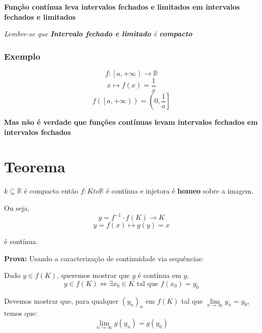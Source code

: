 \documentclass[12pt]{article}
\begin{document}
    \textbf{Função contínua leva intervalos fechados e limitados em intervalos fechados e limitados}
    
    \textit{Lembre-se que \textbf{Intervalo fechado e limitado} é \textbf{compacto}}

    \subsubsection*{Exemplo}
    \begin{equation*}
        f: \left[ a, + \infty \right) \to \mathbb{R}
    \end{equation*}
    \begin{equation*}
        x \mapsto f(x) = \frac{1}{x}
    \end{equation*}
    \begin{equation*}
        f\left( \left[a, + \infty \right) \right) = \left( 0, \frac{1}{a}\right]
    \end{equation*}

    \textbf{Mas não é verdade que funções contínuas levam intervalos fechados em intervalos fechados}

    \section*{Teorema}
    $k \subseteq \mathbb{R}$ é compacto então $f: K to \mathbb{R}$ é contínua  e injetora é \textbf{homeo} sobre a imagem.

    Ou seja, 
    \begin{equation*}
        g = f^{-1} \cdot f(K) \to K
    \end{equation*}
    \begin{equation*}
        y = f(x) \mapsto g(y) = x
    \end{equation*}

    é contínua.

    \textbf{Prova: } Usando a caracterização de continuidade via sequências:

    Dado $y \in f(K)$, queremos mostrar que $g$ é contínua em $y$. 
    \begin{equation*}
        y \in f(K) \iff \exists x_0 \in K \text{ tal que } f(x_0) = y_0
    \end{equation*}

    Devemos mostrar que, para qualquer $(y_n)_n$ em $f(K)$ tal que $\lim \limits_{n \to \infty} y_n = y_0$, temos que:
    \begin{equation*}
        \lim \limits_{n \to \infty} g(y_n) = g(y_0)
    \end{equation*}
\end{document}
